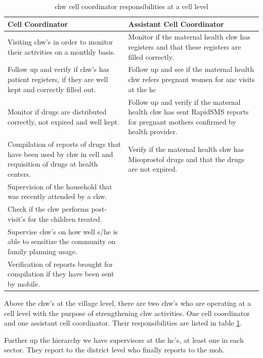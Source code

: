 \begin{table}
\centering
\begin{tabular}{|p{6cm}|p{6cm}|}
\hline
\large{Cell Coordinator} & \large{Assistant Cell Coordinator} \\
\hline
Visiting \gls{chw}'s in order to monitor their activities on a monthly basis. & Monitor if the maternal health \gls{chw} has registers and that these registers are filled correctly. \\
\hline
Follow up and verify if \gls{chw}'s has patient registers, if they are well kept and correctly filled out. & Follow up and see if the maternal health \gls{chw} refers pregnant women for \gls{anc} visits at the \gls{hc} \\
\hline
Monitor if drugs are distributed correctly, not expired and well kept. & Follow up and verify if  the maternal health \gls{chw} has sent RapidSMS reports for pregnant mothers confirmed by health provider.\\
\hline
Compilation of reports of drugs that have been used by \gls{chw} in cell and requisition of drugs at health centers. & Verify if the maternal health \gls{chw} has Misoprostol drugs and that the drugs are not expired. \\
\hline
Supervision of the household that was recently attended by a \gls{chw}. & \\
\cline{1-1}
Check if the \gls{chw} performs post-visit's for the children treated. & \\
\cline{1-1}
Supervise \gls{chw}'s on how well s/he is able to sensitize the community on family planning usage. & \\
\cline{1-1}
Verification of reports brought for compilation if they have been sent by mobile. & \\
\hline
\end{tabular}
\caption{\gls{chw} cell coordinator responsibilities at a cell level}
\label{table:cellcoordinator}
\end{table}

Above the \gls{chw}'s at the village level, there are two \gls{chw}'s who are operating at a cell level with the purpose of strengthening \gls{chw} activities. One cell coordinator and one assistant cell coordinator. Their responsibilities are listed in table \ref{table:cellcoordinator}.

Further up the hierarchy we have supervisors at the \gls{hc}'s, at least one in each sector. 
They report to the district level who finally reports to the \gls{moh}. 

